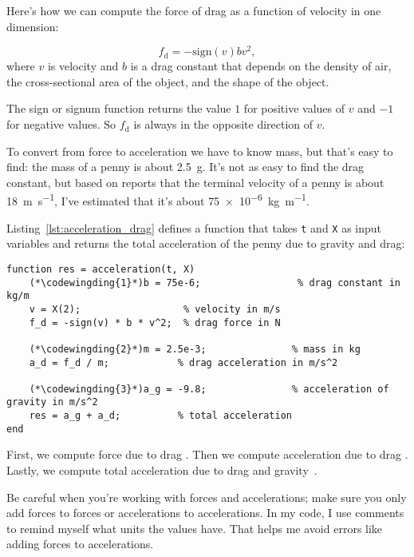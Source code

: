 Here's how we can compute the force of drag as a function of velocity in one dimension:

\begin{equation*}
    f_\mathrm{d} = -\mathrm{sign}(v) b v^2 ,
\end{equation*}
where $v$ is velocity and
$b$ is a drag constant that depends on the density of
air, the cross-sectional area of the object, and the shape
of the object.  

The sign or signum function returns the value $1$ for positive values of 
$v$ and $-1$ for negative values.  So $f_\mathrm{d}$ is always in the opposite direction of $v$.


To convert from force to acceleration we have to know mass, but that's easy to find: the mass of a penny is about \SI{2.5}{\gram}.  It's not as easy to find the drag constant, but based on reports that the terminal velocity of a penny is about \SI{18}{\meter \per \second}, I've estimated that it's about \SI{75e-6}{\kilogram \per \meter}.

Listing~\ref{lst:acceleration_drag} defines a function that takes \lstinline{t} and \lstinline{X} as input variables and returns the total acceleration of the penny due to gravity and drag:

\begin{lstlisting}[caption={Calculating acceleration of a penny with drag}, label={lst:acceleration_drag}]
function res = acceleration(t, X)
    (*\codewingding{1}*)b = 75e-6;                 % drag constant in kg/m
    v = X(2);                  % velocity in m/s
    f_d = -sign(v) * b * v^2;  % drag force in N

    (*\codewingding{2}*)m = 2.5e-3;               % mass in kg
    a_d = f_d / m;            % drag acceleration in m/s^2

    (*\codewingding{3}*)a_g = -9.8;               % acceleration of gravity in m/s^2
    res = a_g + a_d;          % total acceleration
end
\end{lstlisting}

First, we compute force due to drag .
Then we compute acceleration due to drag .
Lastly, we compute total acceleration due to drag and gravity~.


Be careful when you're working with forces and accelerations; make sure
you only add forces to forces or accelerations to accelerations.  In my
code, I use comments to remind myself what units the values have.
That helps me avoid errors like adding forces to accelerations.

